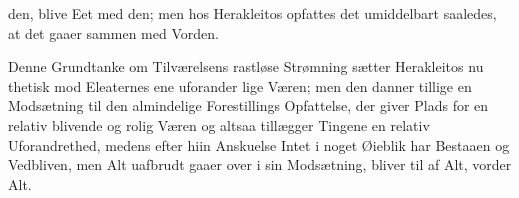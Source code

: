 \documentclass[12pt,a4paper]{book}
\begin{document}
%
%
den, blive Eet med den; men hos Herakleitos opfattes det
umiddelbart saaledes, at det gaaer sammen med Vorden.

Denne Grundtanke om Tilværelsens rastløse Strømning
sætter Herakleitos nu thetisk mod Eleaternes ene uforander\-%
lige Væren; men den danner tillige en Modsætning til den
almindelige Forestillings Opfattelse, der giver Plads for en
relativ blivende og rolig Væren og altsaa tillægger Tingene en
relativ Uforandrethed, medens efter hiin Anskuelse Intet i noget
Øieblik har Bestaaen og Vedbliven, men Alt uafbrudt gaaer
over i sin Modsætning, bliver til af Alt, vorder Alt.
\end{document}
